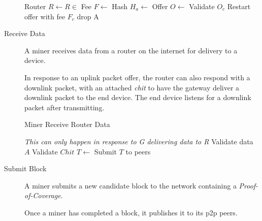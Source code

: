 \documentclass[10pt, nonatbib, nocopyrightspace, reprint]{sigplanconf}
\begin{document}
\begin{description}
\begin{algorithm}[!htb]
       {
        Router $R \leftarrow R \in $  \;
        Fee $F \leftarrow $  \;
        Hash $H_a \leftarrow $  \;
        Offer $O \leftarrow $  \;
         {
           {
            Validate $O_c$
             {
               {
                Restart offer with fee $F_c$\;
              }
               {
                drop A \;
              }
            }
          }
        }
      }
    \end{algorithm}
    \FloatBarrier


  \item [Receive Data] A miner receives data from a router on the internet for delivery to a device.

    In response to an uplink packet offer, the router can also respond with a downlink packet, with an attached \emph{chit} to have the gateway deliver a downlink packet to the end device. The end device listens for a downlink packet after transmitting.

    \begin{algorithm}[!htb]
      \DontPrintSemicolon
      \caption{Miner Receive Router Data}\label{proto:miner.data.receive}

       {
        \emph{This can only happen in response to G delivering data to R}
        Validate data $A$ \;
        Validate $Chit$\;
         \;
        $T \leftarrow $  \;
        Submit $T$ to peers\;
      }
    \end{algorithm}
    \FloatBarrier


  \item [Submit Block] A miner submits a new candidate block to the network containing a \emph{Proof-of-Coverage}.

    Once a miner has completed a block, it publishes it to its p2p peers.


\end{description}
\end{document}
